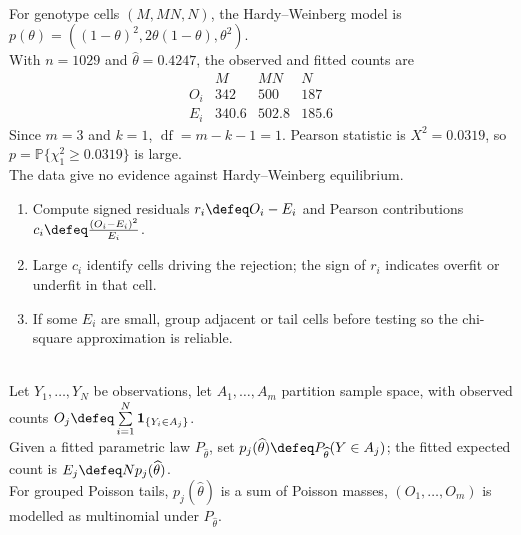 \begin{example} \label{ex:hardy-weinberg-goodness-of-fit} \\
For genotype cells $(M,MN,N)$, the Hardy--Weinberg model is $p(\theta)=((1-\theta)^2,2\theta(1-\theta),\theta^2)$.\\
With $n=1029$ and $\widehat{\theta}=0.4247$, the observed and fitted counts are
\[
\begin{array}{c|ccc}
&M&MN&N\\ \hline
O_i&342&500&187\\
E_i&340.6&502.8&185.6
\end{array}
\]
Since $m=3$ and $k=1$, $\operatorname{df}=m-k-1=1$. Pearson statistic is $X^2=0.0319$, so $p=\mathbb{P}\{\chi^2_1\geq0.0319\}$ is large.\\
The data give no evidence against Hardy--Weinberg equilibrium.
\end{example}

\begin{method} \label{meth:reading-goodness-of-fit-cells} 
\begin{enumerate}[label=(\roman*)]
\setlength{\itemsep}{0pt}
\item Compute signed residuals $r_i\defeq O_i-E_i$ and Pearson contributions $c_i\defeq\frac{(O_i-E_i)^2}{E_i}$.
\item Large $c_i$ identify cells driving the rejection; the sign of $r_i$ indicates overfit or underfit in that cell.
\item If some $E_i$ are small, group adjacent or tail cells before testing so the chi-square approximation is reliable.
\end{enumerate}
\end{method}

\begin{remark} \label{rem:grouped-poisson-fit-expected-cell-counts} \\
Let $Y_1,\ldots,Y_N$ be observations, let $A_1,\ldots,A_m$ partition sample space, with observed counts $O_j\defeq\sum\limits_{i=1}^{N}\mathbf{1}_{\{Y_i\in A_j\}}$.\\
Given a fitted parametric law $P_{\widehat{\theta}}$, set $p_j(\widehat{\theta})\defeq P_{\widehat{\theta}}(Y\in A_j)$; the fitted expected count is $E_j\defeq Np_j(\widehat{\theta})$.\\
For grouped Poisson tails, $p_j(\widehat{\theta})$ is a sum of Poisson masses, $(O_1,\ldots,O_m)$ is modelled as multinomial under $P_{\widehat{\theta}}$.
\end{remark}


